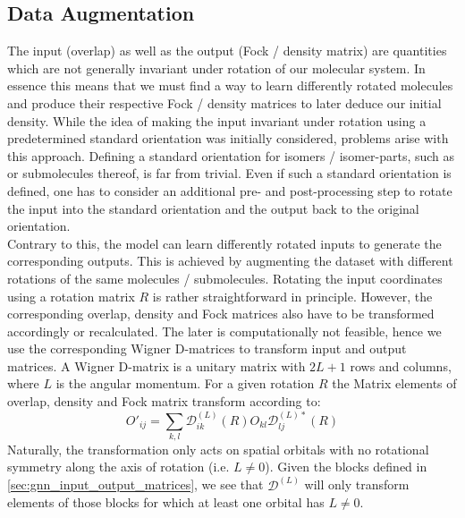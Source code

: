 \subsection{Data Augmentation}
\label{subsec:gnn_data_augmentation}
The input (overlap) as well as the output (Fock / density matrix) are quantities which are not generally invariant under rotation of our molecular system. In essence this means that we must find a way to learn differently rotated molecules and produce their respective Fock / density matrices to later deduce our initial density. While the idea of making the input invariant under rotation using a predetermined standard orientation was initially considered, problems arise with this approach. Defining a standard orientation for isomers / isomer-parts, such as  or submolecules thereof, is far from trivial. Even if such a standard orientation is defined, one has to consider an additional pre- and post-processing step to rotate the input into the standard orientation and the output back to the original orientation. \\
Contrary to this, the model can learn differently rotated inputs to generate the corresponding outputs. This is achieved by augmenting the dataset with different rotations of the same molecules / submolecules. Rotating the input coordinates using a rotation matrix $R$ is rather straightforward in principle. However, the corresponding overlap, density and Fock matrices also have to be transformed accordingly or recalculated. The later is computationally not feasible, hence we use the corresponding Wigner D-matrices to transform input and output matrices. 
A Wigner D-matrix is a unitary matrix with $2L + 1$ rows and columns, where $L$ is the angular momentum. For a given rotation $R$ the Matrix elements of overlap, density and Fock matrix transform according to:
\begin{equation}
    \label{eq:wigner_d_transform}
    O'_{ij} = \sum_{k,l} \mathcal{D}^{(L)}_{ik}(R) O_{kl} \mathcal{D}^{(L)*}_{lj}(R)
\end{equation}
Naturally, the transformation only acts on spatial orbitals with no rotational symmetry along the axis of rotation (i.e. $L \neq 0$). Given the blocks defined in \autoref{sec:gnn_input_output_matrices}, we see that $\mathcal{D}^{(L)}$ will only transform elements of those blocks for which at least one orbital has $L \neq 0$.


